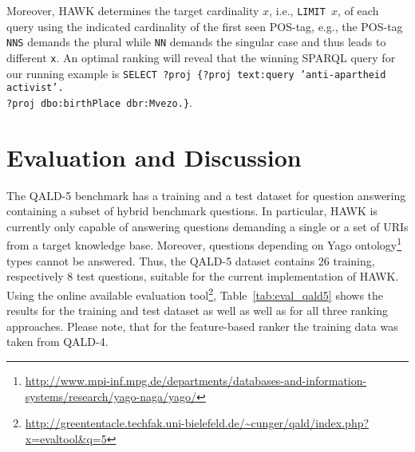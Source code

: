 Moreover, HAWK determines the target cardinality $x$, i.e., \texttt{LIMIT $x$}, of each query using the indicated cardinality of the first seen POS-tag, e.g., the POS-tag \texttt{NNS} demands the plural while \texttt{NN} demands the singular case and thus leads to different \texttt{x}.
An optimal ranking will reveal that the winning SPARQL query for our running example is \texttt{SELECT ?proj  \{?proj text:query 'anti-apartheid activist'.\\ ?proj dbo:birthPlace dbr:Mvezo.\}}.


\section{Evaluation and Discussion}
\label{chaclef:sec:discussion}
\sloppy
The QALD-5 benchmark has a training and a test dataset for question answering containing a subset of hybrid benchmark questions.
In particular, HAWK is currently only capable of answering questions demanding a single or a set of URIs from a target knowledge base. 
Moreover, questions depending on Yago ontology\footnote{\url{http://www.mpi-inf.mpg.de/departments/databases-and-information-systems/research/yago-naga/yago/}} types cannot be answered.
Thus, the QALD-5 dataset contains 26 training, respectively 8 test questions, suitable for the current implementation of HAWK.
Using the online available evaluation tool\footnote{\url{http://greententacle.techfak.uni-bielefeld.de/~cunger/qald/index.php?x=evaltool&q=5}}, Table~\ref{tab:eval_qald5} shows the results for the training and test dataset as well as well as for all three ranking approaches.
Please note, that for the feature-based ranker the training data was taken from QALD-4.

\begin{table}[h]
\centering
\caption{Results of the QALD-5 challenge for different ranking algorithms. Number in brackets show the amount of generated answers, i.e., HAWK outputs at least one result set.}
\label{tab:eval_qald5}
\end{table}

